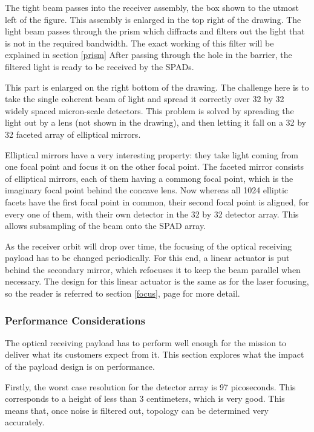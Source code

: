 The tight beam passes into the receiver assembly, the box shown to the utmost left of the figure. This assembly is enlarged in the top right of the drawing. The light beam passes through the prism which diffracts and filters out the light that is not in the required bandwidth. The exact working of this filter will be explained in section \ref{prism} After passing through the hole in the barrier, the filtered light is ready to be received by the \acp{SPAD}.

This part is enlarged on the right bottom of the drawing. The challenge here is to take the single coherent beam of light and spread it correctly over 32 by 32 widely spaced micron-scale detectors. This problem is solved by spreading the light out by a lens (not shown in the drawing), and then letting it fall on a 32 by 32 faceted array of elliptical mirrors.

Elliptical mirrors have a very interesting property: they take light coming from one focal point and focus it on the other focal point. The faceted mirror consists of elliptical mirrors, each of them having a commong focal point, which is the imaginary focal point behind the concave lens. Now whereas all 1024 elliptic facets have the first focal point in common, their second focal point is aligned, for every one of them, with their own detector in the 32 by 32 detector array. This allows subsampling of the beam onto the \ac{SPAD} array.

As the receiver orbit will drop over time, the focusing of the optical receiving payload has to be changed periodically. For this end, a linear actuator is put behind the secondary mirror, which refocuses it to keep the beam parallel when necessary. The design for this linear actuator is the same as for the laser focusing, so the reader is referred to section \ref{focus}, page \pageref{focus} for more detail.

\subsubsection{Performance Considerations}
The optical receiving payload has to perform well enough for the mission to deliver what its customers expect from it. This section explores what the impact of the payload design is on performance.

Firstly, the worst case resolution for the detector array is 97 picoseconds. This corresponds to a height of less than 3 centimeters, which is very good. This means that, once noise is filtered out, topology can be determined very accurately.

